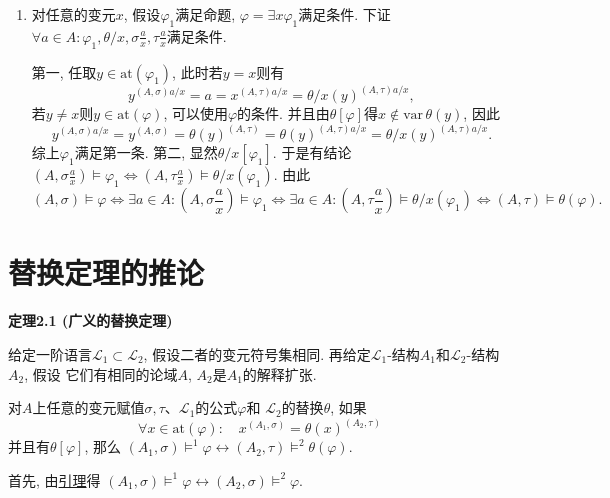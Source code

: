 \begin{enumerate}
    \item 对任意的变元$x$, 假设$\varphi_1$满足命题,
    $\varphi=\exists x\varphi_1$满足条件. 下证$\forall a\in A:
    \displaystyle\varphi_1,\theta/x,\sigma\frac{a}{x},\tau\frac{a}{x}$满足条件.

    \hspace{2.17em}
    第一, 任取$y\in\mathrm{at}(\varphi_1)$, 此时若$y=x$则有
    \[
        y^{(A,\sigma)a/x}=a=x^{(A,\tau)a/x}=\theta/x(y)^{(A,\tau)a/x},
    \]
    若$y\neq x$则$y\in\mathrm{at}(\varphi)$, 可以使用$\varphi$的条件.
    并且由$\theta[\varphi]$得$x\notin\mathrm{var}\,\theta(y)$, 因此
    \[
        y^{(A,\sigma)a/x}=y^{(A,\sigma)}=\theta(y)^{(A,\tau)}
        =\theta(y)^{(A,\tau)a/x}=\theta/x(y)^{(A,\tau)a/x}.
    \]
    综上$\varphi_1$满足第一条. 第二, 显然$\theta/x[\varphi_1]$.
    于是有结论$\displaystyle\left(A,\sigma\frac{a}{x}\right)\models\varphi_1\iff
    \left(A,\tau\frac{a}{x}\right)\models\theta/x(\varphi_1)$. 由此
    \begin{equation*}
        (A,\sigma)\models\varphi\iff
        \exists a\in A:\left(A,\sigma\frac{a}{x}\right)\models\varphi_1\iff
        \exists a\in A:\left(A,\tau\frac{a}{x}\right)\models\theta/x(\varphi_1)\iff
        (A,\tau)\models\theta(\varphi).
    \tag*{\qedsymbol}\end{equation*}
\end{enumerate}





\newpage

\section{替换定理的推论}

\hypertarget{sec:定理2.1}{}
\noindent\textbf{定理2.1 (广义的替换定理)}

给定一阶语言$\mathcal{L}_1\subset\mathcal{L}_2$, 假设二者的变元符号集相同.
再给定$\mathcal{L}_1$-结构$A_1$和$\mathcal{L}_2$-结构$A_2$, 假设
它们有相同的论域$A$, $A_2$是$A_1$的解释扩张.

对$A$上任意的变元赋值$\sigma,\tau$、$\mathcal{L}_1$的公式$\varphi$和
$\mathcal{L}_2$的替换$\theta$, 如果
\[
    \forall x\in\mathrm{at}(\varphi):\quad x^{(A_1,\sigma)}=\theta(x)^{(A_2,\tau)}
\]
并且有$\theta[\varphi]$, 那么
$(A_1,\sigma)\models^1\varphi\leftrightarrow(A_2,\tau)\models^2\theta(\varphi)$.


首先, 由\href{02 语言的限制与扩张#nameddest=sec:定理1.2}{引理}得
$(A_1,\sigma)\models^1\varphi\leftrightarrow(A_2,\sigma)\models^2\varphi$.

